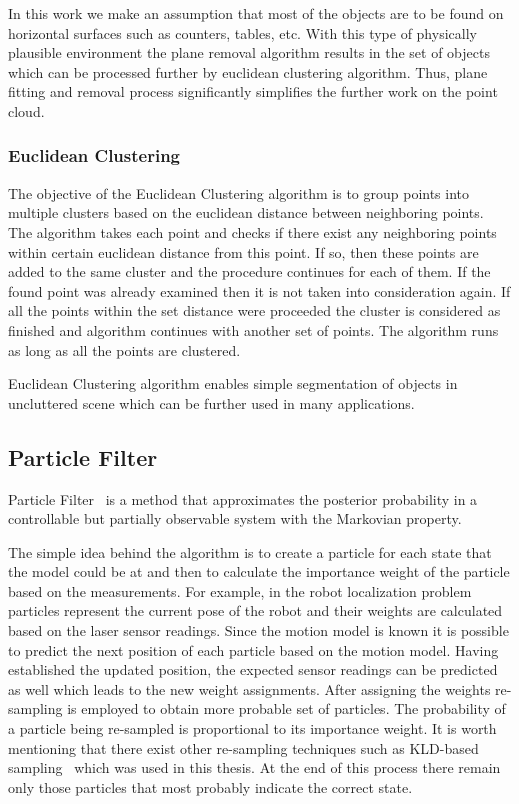 In this work we make an assumption that most of the 
objects are to be found on horizontal surfaces such as counters, tables, etc. With this type of physically plausible environment the plane removal algorithm results in the set of objects which can be processed further by euclidean clustering algorithm. Thus, plane fitting and removal process significantly simplifies the further work on the point cloud.



\subsubsection{Euclidean Clustering}
The objective of the Euclidean Clustering algorithm is to group points into multiple clusters based on the euclidean distance between neighboring points. The algorithm takes each point and checks if there exist any neighboring points within certain euclidean distance from this point. If so, then these points are added to the same cluster and the procedure continues for each of them. If the found point was already examined then it is not taken into consideration again. If all the points within the set distance were proceeded the cluster is considered as finished and algorithm continues with another set of points. The algorithm runs as long as all the points are clustered. 

Euclidean Clustering algorithm enables simple segmentation of objects in uncluttered scene which can be further used in many applications.   

\subsection{Particle Filter}
Particle Filter~\cite{Thrun02d} is a method that approximates the posterior probability in a controllable but partially observable system with the Markovian property. 

The simple idea behind the algorithm is to create a particle for each state that the model could be at and then to calculate the importance weight of the particle based on the measurements. For example, in the robot localization problem particles represent the current pose of the robot and their weights are calculated based on the laser sensor readings. Since the motion model is known it is possible to predict the next position of each particle based on the motion model. Having established the updated position, the expected sensor readings can be predicted as well which leads to the new weight assignments. After assigning the weights re-sampling is employed to obtain more probable set of particles. The probability of a particle being re-sampled is proportional to its importance weight. It is worth mentioning that there exist other re-sampling techniques such as KLD-based sampling~\cite{Fox01KLD} which was used in this thesis.  At the end of this process there remain only those particles that most probably indicate the correct state.


